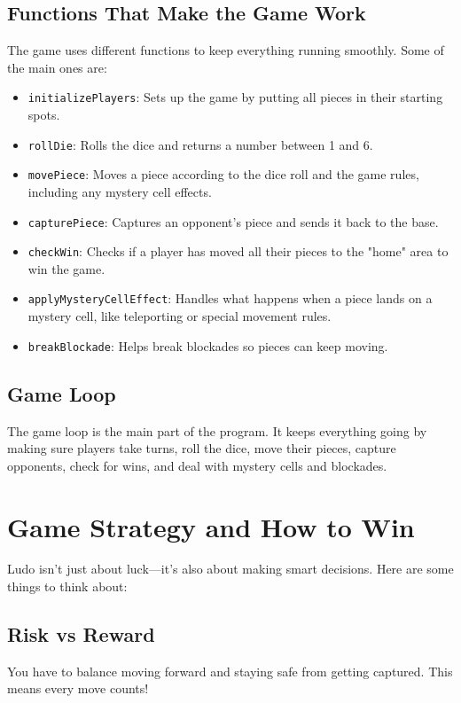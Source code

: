 \documentclass[12pt]{article}
\begin{document}
\subsection{Functions That Make the Game Work}
The game uses different functions to keep everything running smoothly. Some of the main ones are:
\begin{itemize}
    \item \texttt{initializePlayers}: Sets up the game by putting all pieces in their starting spots.
    \item \texttt{rollDie}: Rolls the dice and returns a number between 1 and 6.
    \item \texttt{movePiece}: Moves a piece according to the dice roll and the game rules, including any mystery cell effects.
    \item \texttt{capturePiece}: Captures an opponent's piece and sends it back to the base.
    \item \texttt{checkWin}: Checks if a player has moved all their pieces to the "home" area to win the game.
    \item \texttt{applyMysteryCellEffect}: Handles what happens when a piece lands on a mystery cell, like teleporting or special movement rules.
    \item \texttt{breakBlockade}: Helps break blockades so pieces can keep moving.
\end{itemize}

\subsection{Game Loop}
The game loop is the main part of the program. It keeps everything going by making sure players take turns, roll the dice, move their pieces, capture opponents, check for wins, and deal with mystery cells and blockades.

\section{Game Strategy and How to Win}
Ludo isn’t just about luck—it’s also about making smart decisions. Here are some things to think about:

\subsection{Risk vs Reward}
You have to balance moving forward and staying safe from getting captured. This means every move counts!
\end{document}
